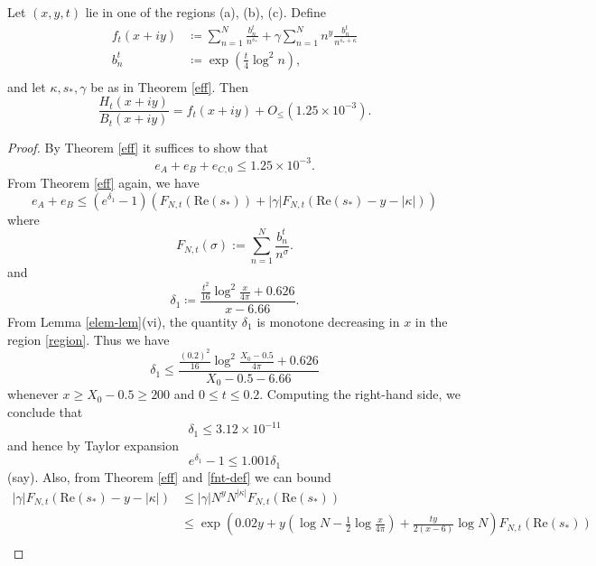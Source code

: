 \begin{proposition}\label{sweep}  Let $(x,y,t)$ lie in one of the regions (a), (b), (c).
Define
\begin{align*}
f_t(x+iy) &\coloneqq \sum_{n=1}^N \frac{b_n^t}{n^{s_*}} + \gamma \sum_{n=1}^N n^y \frac{b_n^t}{n^{\overline{s_*} + \kappa}}\\
b_n^t &\coloneqq \exp( \frac{t}{4} \log^2 n),\\
\end{align*}
and let $\kappa, s_*, \gamma$ be as in Theorem \ref{eff}.  Then
\begin{equation}\label{bbb}
\frac{H_t(x+iy)}{B_t(x+iy)} = f_t(x+iy) + O_{\leq}( 1.25 \times 10^{-3} ).
\end{equation}
\end{proposition}

\begin{proof} 
By Theorem \ref{eff} it suffices to show that
$$ e_A + e_B + e_{C,0} \leq 1.25 \times 10^{-3}.$$
From Theorem \ref{eff} again, we have
\begin{equation}\label{eaeb-bound}
 e_A + e_B \leq (e^{\delta_1}-1) (F_{N,t}(\mathrm{Re}(s_*)) + |\gamma| F_{N,t}( \mathrm{Re}(s_*) - y - |\kappa| ) )
\end{equation}
where
\begin{equation}\label{fnt-def}
 F_{N,t}( \sigma ) := \sum_{n=1}^N \frac{b_n^t}{n^\sigma}.
\end{equation}
and
\begin{equation}\label{dela}
 \delta_1 \coloneqq \frac{\frac{t^2}{16} \log^2 \frac{x}{4\pi} + 0.626}{x-6.66}.
\end{equation}
From Lemma \ref{elem-lem}(vi), the quantity $\delta_1$ is monotone decreasing in $x$ in the region \eqref{region}.  Thus we have
\begin{equation}\label{delta1-bound}
 \delta_1 \leq \frac{\frac{(0.2)^2}{16} \log^2 \frac{X_0-0.5}{4\pi} + 0.626}{X_0-0.5-6.66}
\end{equation}
whenever $x \geq X_0-0.5 \geq 200$ and $0 \leq t \leq 0.2$.  Computing the right-hand side, we conclude that
$$  \delta_1 \leq 3.12 \times 10^{-11}$$
and hence by Taylor expansion
$$ e^{\delta_1} - 1 \leq 1.001 \delta_1$$
(say).
Also, from Theorem \ref{eff} and \eqref{fnt-def} we can bound
\begin{align*}
|\gamma| F_{N,t}( \mathrm{Re}(s_*) - y - |\kappa| ) &\leq |\gamma| N^y N^{|\kappa|} F_{N,t}( \mathrm{Re}(s_*) ) \\
&\leq \exp\left( 0.02 y + y \left(\log N - \frac{1}{2} \log \frac{x}{4\pi}\right) + \frac{ty}{2(x-6)} \log N \right) F_{N,t}( \mathrm{Re}(s_*) )  \\

\end{align*}
\end{proof}
